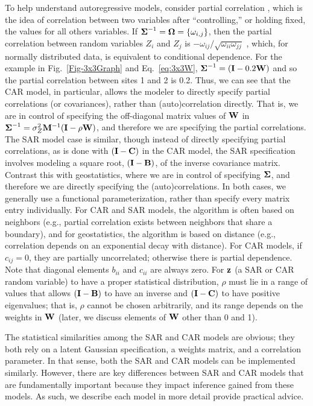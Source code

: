 \documentclass[11pt, titlepage]{article}\usepackage[]{graphicx}\usepackage[]{color}
\begin{document}
\begin{spacing}{1.9}
\begin{flushleft}
To help understand autoregressive models, consider partial correlation \citep[e.g.,][pg. 361]{Sned:Coch:stat:1980}, which is the idea of correlation between two variables after ``controlling,'' or holding fixed, the values for all others variables. If $\mbox{\boldmath $\Sigma$}^{-1} = \mbox{\boldmath $\Omega$} = \{\omega_{i,j}\}$, then the partial correlation between random variables $Z_i$ and $Z_j$ is $-\omega_{ij}/\sqrt{\omega_{ii}\omega_{jj}}$ \citep[pg. 120]{Laur:grap:1996}, which, for normally distributed data, is equivalent to conditional dependence. For the example in Fig.~\ref{Fig-3x3Graph} and Eq.~\ref{eq:3x3W}, $\mbox{\boldmath $\Sigma$}^{-1} = (\mathbf{I} - 0.2\mathbf{W})$ and so the partial correlation between sites 1 and 2 is 0.2. Thus, we can see that the CAR model, in particular, allows the modeler to directly specify partial correlations (or covariances), rather than (auto)correlation directly. That is, we are in control of specifying the off-diagonal matrix values of $\mathbf{W}$ in $\mbox{\boldmath $\Sigma$}^{-1} = \sigma^2_Z\mathbf{M}^{-1}(\mathbf{I}-\rho\mathbf{W})$, and therefore we are specifying the partial correlations. The SAR model case is similar, though instead of directly specifying partial correlations, as is done with $(\mathbf{I} - \mathbf{C})$ in the CAR model, the SAR specification involves modeling a square root, $(\mathbf{I} - \mathbf{B})$, of the inverse covariance matrix. Contrast this with geostatistics, where we are in control of specifying $\mbox{\boldmath $\Sigma$}$, and therefore we are directly specifying the (auto)correlations.  In both cases, we generally use a functional parameterization, rather than specify every matrix entry individually.  For CAR and SAR models, the algorithm is often based on neighbors (e.g., partial correlation exists between neighbors that share a boundary), and for geostatistics, the algorithm is based on distance (e.g., correlation depends on an exponential decay with distance). For CAR models, if $c_{ij} = 0$, they are partially uncorrelated; otherwise there is partial dependence. Note that diagonal elements $b_{ii}$ and $c_{ii}$ are always zero.  For $\mathbf{z}$ (a SAR or CAR random variable) to have a proper statistical distribution, $\rho$ must lie in a range of values that allows $(\mathbf{I}-\mathbf{B})$ to have an inverse and $(\mathbf{I} - \mathbf{C})$ to have positive eigenvalues; that is, $\rho$ cannot be chosen arbitrarily, and its range depends on the weights in $\mathbf{W}$ (later, we discuss elements of $\mathbf{W}$ other than 0 and 1).

The statistical similarities among the SAR and CAR models are obvious; they both rely on a latent Gaussian specification, a weights matrix, and a correlation parameter. In that sense, both the SAR and CAR models can be implemented similarly. However, there are key differences between SAR and CAR models that are fundamentally important because they impact inference gained from these models. As such, we describe each model in more detail provide practical advice.


\end{flushleft}
\end{spacing}
\end{document}
